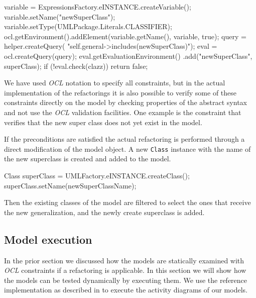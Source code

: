 \documentclass{llncs}
\begin{document}
\begin{lstsingle}[language=Java,caption=OCL validation in Java,label=lst:ocl]
variable = ExpressionsFactory.eINSTANCE.createVariable();
variable.setName("newSuperClass");
variable.setType(UMLPackage.Literals.CLASSIFIER);
ocl.getEnvironment().addElement(variable.getName(),
                                variable, true);
query = helper.createQuery(
    "self.general->includes(newSuperClass)");
eval = ocl.createQuery(query);
eval.getEvaluationEnvironment()
    .add("newSuperClass", superClass);
if (!eval.check(clazz))
    return false;
\end{lstsingle}

We have used \textit{OCL} notation to specify all constraints, but in the actual implementation of the refactorings it
is also possible to verify some of these constraints directly on the model by checking properties of the abstract syntax
and not use the \textit{OCL} validation facilities. One example is the constraint that verifies that the new super class does not
yet exist in the model.

If the preconditions are satisfied the actual refactoring is performed through a direct modification of the model object.
A new \texttt{Class} instance with the name of the new superclass is created and added to the model. 

\begin{lstsingle}[language=Java,caption=UML element creation,label=lst:createclass]
Class superClass = UMLFactory.eINSTANCE.createClass();
superClass.setName(newSuperClassName);
\end{lstsingle}


Then the existing
classes of the model are filtered to select the ones that receive the new generalization, and the newly create superclass
is added.

\subsection{Model execution}
\label{sec:execution}
In the prior section we discussed how the models are statically examined with \textit{OCL} constraints if a refactoring 
is applicable. In this section we will show how the models can be tested dynamically by executing them. We use the 
reference implementation as described in \cite{DBLP:conf/models/MayerhoferLK12} to execute the activity diagrams of 
our models.
\end{document}
